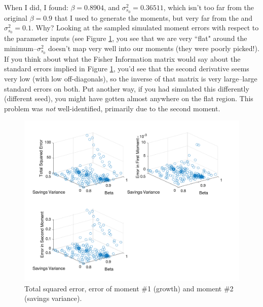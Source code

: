 \documentclass[11pt]{article}
\begin{document}
When I did, I found:  $\beta=0.8904$, and $\sigma^2_{s_0}= 0.36511$, which isn't too far from the original $\beta=0.9$ that I used to generate the moments, but very far from the  and $\sigma^2_{s_0}= 0.1$.  Why?  Looking at the sampled simulated moment errors with respect to the parameter inputs (see Figure \ref{Moments}, you see that we are very ``flat" around the minimum--$\sigma^2_{s_0}$ doesn't map very well into our moments (they were poorly picked!).  If you think about what the Fisher Information matrix would say about the standard errors implied in Figure \ref{Moments}, you'd see that the second derivative seems very low (with low off-diagonals), so the inverse of that matrix is very large--large standard errors on both.  Put another way, if you had simulated this differently (different seed), you might have gotten almost anywhere on the flat region.  This problem was \emph{not} well-identified, primarily due to the second moment.

\begin{figure}[ht!]
\centering
\includegraphics[scale=0.5]{IdentificationFig.png}
\caption{Total squared error, error of moment \#1 (growth) and moment \#2 (savings variance).}
\label{Moments}
\end{figure}
\end{document}

